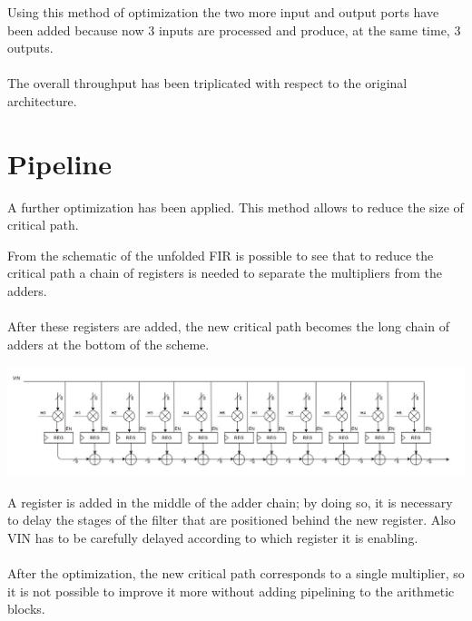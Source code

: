 Using this method of optimization the two more input and output ports have been added because
now 3 inputs are processed and produce, at the same time, 3 outputs. 
\paragraph{}
The overall throughput has
been triplicated with respect to the original architecture.


\section{Pipeline}

A further optimization has been applied. This method allows to reduce the size of critical path.

From the schematic of the unfolded FIR is possible to see that to reduce the critical path a chain of registers
is needed to separate the multipliers from the adders. 
\paragraph{}
After these registers are added, the new critical path 
becomes the long chain of adders at the bottom of the scheme.

\centerline{
\includegraphics[width=15.5cm]{./chapters/figures/fir_adv_1.jpg}}

\vspace{5mm}

A register is added in the middle of the adder chain; by doing so, it is necessary to delay the stages of the filter
that are positioned behind the new register. Also VIN has to be carefully delayed according to which register it is enabling.
\paragraph{}
After the optimization, the new critical path corresponds to a single multiplier, so it is not possible to improve it more
without adding pipelining to the arithmetic blocks.

